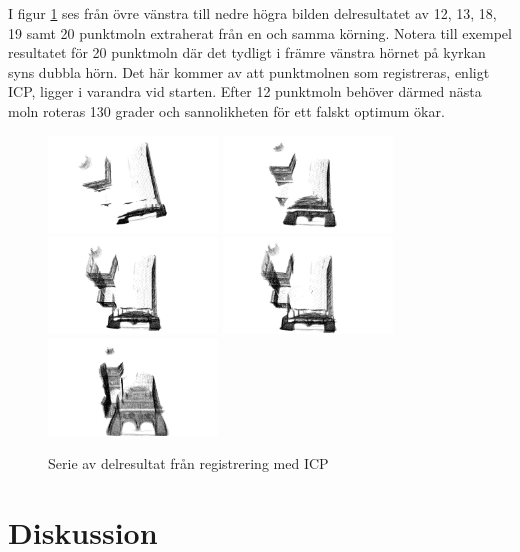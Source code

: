 I figur \ref{fig:registered_church_serie} ses från övre vänstra till nedre högra bilden delresultatet av 12, 13, 18, 19 samt 20 punktmoln extraherat från en och samma körning. Notera till exempel resultatet för 20 punktmoln där det tydligt i främre vänstra hörnet på kyrkan syns dubbla hörn. Det här kommer av att punktmolnen som registreras, enligt ICP, ligger i varandra vid starten. Efter 12 punktmoln behöver därmed nästa moln roteras 130 grader och sannolikheten för ett falskt optimum ökar.
\begin{figure}[H]
	\centering
	\includegraphics[width=45mm]{figures/12_pc.png}
	\includegraphics[width=45mm]{figures/13_pc.png}
	\includegraphics[width=45mm]{figures/18_pc.png}
	\includegraphics[width=45mm]{figures/19_pc.png}
	\includegraphics[width=45mm]{figures/20_pc.png}
	\caption{Serie av delresultat från registrering med ICP}
	\label{fig:registered_church_serie}
\end{figure}

\section{Diskussion}
\label{sec:discussion-karlsson}

